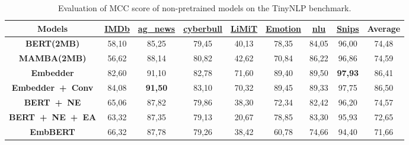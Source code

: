 \begin{table*}[tbp]
    \caption{Evaluation of MCC score of non-pretrained models on the TinyNLP benchmark.}
    \begin{center}
        \begin{tabular}{| c | c c c c c c c c |}
        \hline
        \textbf{Models} & \href{https://huggingface.co/datasets/stanfordnlp/imdb}{\textbf{IMDb}} & \href{https://huggingface.co/datasets/fancyzhx/ag_news}{\textbf{ag\_news}} & \href{https://www.kaggle.com/datasets/andrewmvd/cyberbullying-classification}{\textbf{cyberbull}} & \href{https://huggingface.co/datasets/IBM/limit}{\textbf{LiMiT}} & \href{https://huggingface.co/datasets/dair-ai/emotion}{\textbf{Emotion}} & \href{https://huggingface.co/datasets/xingkunliuxtracta/nlu_evaluation_data}{\textbf{nlu}} & \href{https://huggingface.co/datasets/benayas/snips}{\textbf{Snips}} & \textbf{Average} \\
        \hline \hline
        \textbf{BERT(2MB)}           &  58,10 & 85,25 & 79,45 & 40,13 & 78,35 & 84,05 & 96,00 & 74,48 \\
        \textbf{MAMBA(2MB)}          &  56,62 & 88,14 & 80,82 & 42,62 & 70,84 & 86,22 & 96,86 & 74,59 \\
        \textbf{Embedder}           & 82,60 & 91,10 & 82,78 & 71,60 & 89,40 & 89,50 & \textbf{97,93} & 86,41 \\
        \textbf{Embedder~+~Conv}      & 84,08 & \textbf{91,50} & 83,10 & 70,32 & 89,45 & 89,33 & 97,75 & 86,50 \\
        \textbf{BERT~+~NE}            & 65,06 & 87,82 & 79,86 & 38,30 & 72,34 & 82,42 & 96,20 & 74,57 \\

        \textbf{BERT~+~NE~+~EA}         & 63,32 & 87,35 & 79,13 & 20,67 & 78,85 & 83,30 & 95,93 & 72,65 \\

        \hline
        \textbf{EmbBERT}            & 66,32 & 87,78 & 79,26 & 38,42 & 60,78 & 74,66 & 94,40 & 71,66 \\
        \hline
        \end{tabular}
        \label{table:all_results_tinyNLP_mcc_unpretr}
    \end{center} 
\end{table*}







